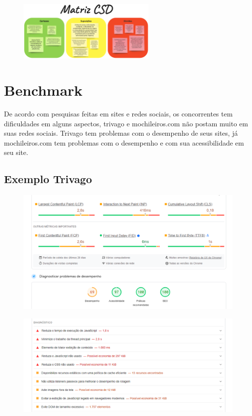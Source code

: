 \documentclass{article}
\begin{document}
\begin{figure}[h]
      \centering
      \includegraphics [width=0.6\textwidth]{IMGDOC/Matriz CSD.png}
      \label{fig:imagem}
\end{figure}

\section{Benchmark}
De acordo com pesquisas feitas em sites e redes sociais, os concorrentes tem dificuldades em alguns aspectos, trivago e mochileiros.com não postam muito em suas redes sociais.
Trivago tem problemas com o desempenho de seus sites, já mochileiros.com tem problemas com o desempenho e com sua acessibilidade em seu site.

\subsection{Exemplo Trivago}

\begin{figure}[h]
      \centering
      \includegraphics [width=1\textwidth]{IMGDOC/AnaliseTrivago1.png}
      \label{fig:imagem}
\end{figure}
\begin{figure}[h]
      \centering
      \includegraphics [width=1\textwidth]{IMGDOC/AnaliseTrivago2.png}
      \label{fig:imagem}
\end{figure}
\end{document}
